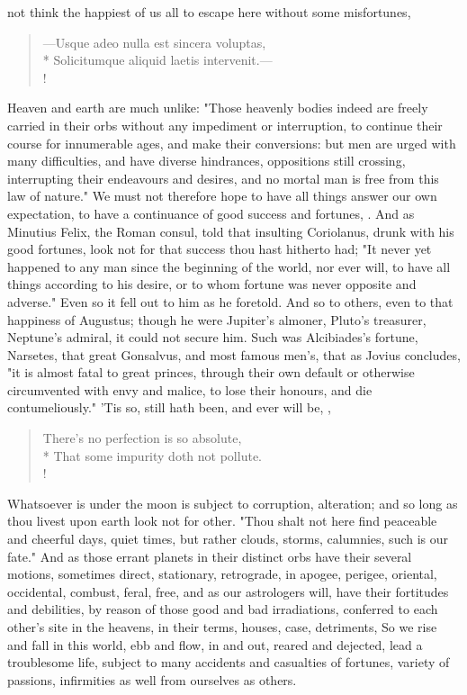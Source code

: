 {not think the happiest of us all to escape here without some misfortunes,

\begin{latin}
\begin{verse}%
---Usque adeo nulla est sincera voluptas,\\*
Solicitumque aliquid laetis intervenit.---\\!
\end{verse}%
\end{latin}
%

Heaven and earth are much unlike: "Those heavenly bodies indeed are freely carried in their orbs without any impediment or interruption, to continue their course for innumerable ages, and make their conversions: but men are urged with many difficulties, and have diverse hindrances, oppositions still crossing, interrupting their endeavours and desires, and no mortal man is free from this law of nature." We must not therefore hope to have all things answer our own expectation, to have a continuance of good success and fortunes, . And as Minutius Felix, the Roman consul, told that insulting Coriolanus, drunk with his good fortunes, look not for that success thou hast hitherto had; "It never yet happened to any man since the beginning of the world, nor ever will, to have all things according to his desire, or to whom fortune was never opposite and adverse." Even so it fell out to him as he foretold. And so to others, even to that happiness of Augustus; though he were Jupiter's almoner, Pluto's treasurer, Neptune's admiral, it could not secure him. Such was Alcibiades's fortune, Narsetes, that great Gonsalvus, and most famous men's, that as Jovius concludes, "it is almost fatal to great princes, through their own default or otherwise circumvented with envy and malice, to lose their honours, and die contumeliously." 'Tis so, still hath been, and ever will be, ,

\begin{verse}%
There's no perfection is so absolute,\\*
That some impurity doth not pollute.\\!
\end{verse}%

Whatsoever is under the moon is subject to corruption, alteration; and so long as thou livest upon earth look not for other. "Thou shalt not here find peaceable and cheerful days, quiet times, but rather clouds, storms, calumnies, such is our fate." And as those errant planets in their distinct orbs have their several motions, sometimes direct, stationary, retrograde, in apogee, perigee, oriental, occidental, combust, feral, free, and as our astrologers will, have their fortitudes and debilities, by reason of those good and bad irradiations, conferred to each other's site in the heavens, in their terms, houses, case, detriments, \etc{} So we rise and fall in this world, ebb and flow, in and out, reared and dejected, lead a troublesome life, subject to many accidents and casualties of fortunes, variety of passions, infirmities as well from ourselves as others.

}
